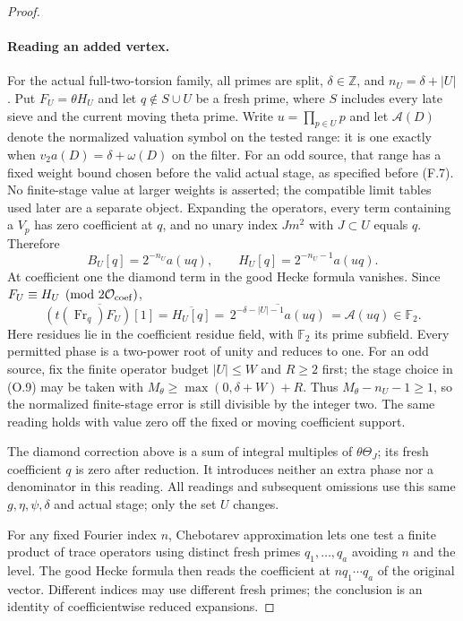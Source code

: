 \documentclass[11pt]{article}
\theoremstyle{definition}
\theoremstyle{remark}
\begin{document}
\begin{proof}
\paragraph{Reading an added vertex.}
For the actual full-two-torsion family, all primes are split,
$\delta\in\mathbb Z$, and $n_U=\delta+|U|$.  Put $F_U=\theta H_U$
and let $q\notin S\cup U$ be a fresh prime, where $S$ includes
every late sieve and the current moving theta prime.
Write $u=\prod_{p\in U}p$ and let $\mathcal A(D)$ denote the
normalized valuation symbol on the tested range: it is one exactly when
$v_2a(D)=\delta+\omega(D)$ on the filter. For an odd source, that
range has a fixed weight bound chosen before the valid actual stage,
as specified before (F.7). No finite-stage value at larger weights is
asserted; the compatible limit tables used later are a separate object.
Expanding the operators, every term containing a $V_p$ has zero
coefficient at $q$, and no unary index $Jm^2$ with $J\subset U$
equals $q$.  Therefore
\[
 B_U[q]=2^{-n_U}a(uq),\qquad
 H_U[q]=2^{-n_U-1}a(uq).
\]
At coefficient one the diamond term in the good Hecke formula
vanishes.  Since $F_U\equiv H_U\pmod{2\mathcal O_{\rm coef}}$,
\[
 \overline{(t(\operatorname{Fr}_q)F_U)[1]}
   =\overline{H_U[q]}
   =\overline{\,2^{-\delta-|U|-1}a(uq)\,}
   =\mathcal A(uq)\in\mathbb F_2.
\]
Here residues lie in the coefficient residue field, with
$\mathbb F_2$ its prime subfield.  Every permitted phase is a
two-power root of unity and reduces to one.  For an odd source,
fix the finite operator budget $|U|\le W$ and $R\ge2$ first;
the stage choice in (O.9) may be taken with
$M_\theta\ge\max(0,\delta+W)+R$.
Thus $M_\theta-n_U-1\ge1$, so the normalized finite-stage error
is still divisible by the integer two.  The same reading holds
with value zero off the fixed or moving coefficient support.

The diamond correction above is a sum of integral multiples of
$\theta\Theta_J$; its fresh coefficient $q$ is zero after reduction.
It introduces neither an extra phase nor a denominator in this
reading.  All readings and subsequent omissions use this same
$g,\eta,\psi,\delta$ and actual stage; only the set $U$ changes.

For any fixed Fourier index $n$, Chebotarev approximation lets one
test a finite product of trace operators using distinct fresh primes
$q_1,\ldots,q_a$ avoiding $n$ and the level. The good Hecke formula
then reads the coefficient at $nq_1\cdots q_a$ of the original vector.
Different indices may use different fresh primes; the conclusion is
an identity of coefficientwise reduced expansions.


\end{proof}
\end{document}
